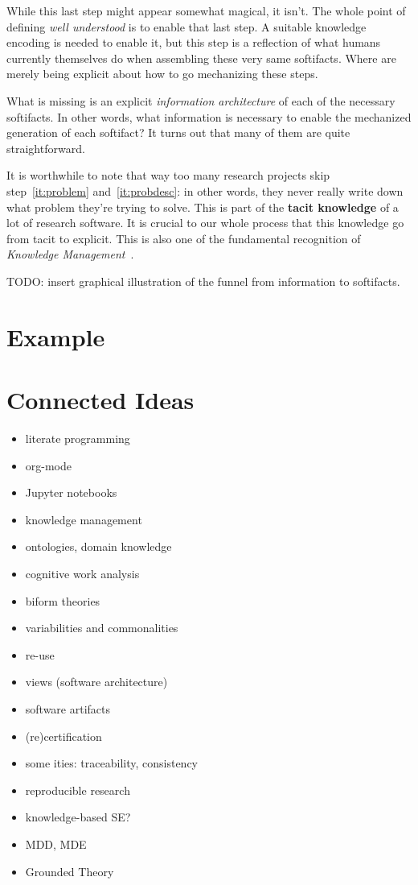 \documentclass[10pt,twoside,onecolumn,openany,letterpaper]{memoir}
\begin{document}
While this last step might appear somewhat magical, it isn't. The whole
point of defining \emph{well understood} is to enable that last step. A
suitable knowledge encoding is needed to enable it, but this step is a
reflection of what humans currently themselves do when assembling these very
same softifacts. Where are merely being explicit about how to go
mechanizing these steps.

What is missing is an explicit \emph{information architecture} of each of
the necessary softifacts. In other words, what information is necessary to
enable the mechanized generation of each softifact? It turns out that many
of them are quite straightforward.

It is worthwhile to note that way too many research projects skip
step~\ref{it:problem} and~\ref{it:probdesc}: in other words, they never really
write down what problem they're trying to solve. This is part of the
\textbf{tacit knowledge} of a lot of research software.  It is crucial to our
whole process that this knowledge go from tacit to explicit. This is also one
of the fundamental recognition of \emph{Knowledge
Management}~\cite{KM-textbook}.

TODO: insert graphical illustration of the funnel from information to
softifacts.

\chapter{Example}\label{ch:example}

\chapter{Connected Ideas}\label{ch:ideas}


\begin{itemize}
\item literate programming
\item org-mode
\item Jupyter notebooks
\item knowledge management
\item ontologies, domain knowledge
\item cognitive work analysis
\item biform theories
\item variabilities and commonalities
\item re-use
\item views (software architecture)
\item software artifacts
\item (re)certification
\item some ities: traceability, consistency
\item reproducible research
\item knowledge-based SE?
\item MDD, MDE
\item Grounded Theory
\end{itemize}
\end{document}
